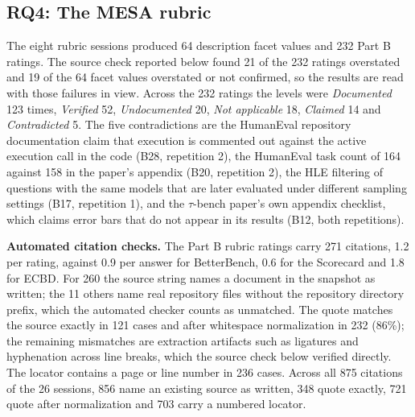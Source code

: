 \documentclass[10pt,conference]{IEEEtran}
\begin{document}
\subsection{RQ4: The MESA rubric}
\label{sec:rq4}
The eight rubric sessions produced 64 description facet values and 232 Part B ratings. The source check reported below found 21 of the 232 ratings overstated and 19 of the 64 facet values overstated or not confirmed, so the results are read with those failures in view. Across the 232 ratings the levels were \emph{Documented} 123 times, \emph{Verified} 52, \emph{Undocumented} 20, \emph{Not applicable} 18, \emph{Claimed} 14 and \emph{Contradicted} 5. The five contradictions are the HumanEval repository documentation claim that execution is commented out against the active execution call in the code (B28, repetition 2), the HumanEval task count of 164 against 158 in the paper's appendix (B20, repetition 2), the HLE filtering of questions with the same models that are later evaluated under different sampling settings (B17, repetition 1), and the $\tau$-bench paper's own appendix checklist, which claims error bars that do not appear in its results (B12, both repetitions).

\textbf{Automated citation checks.} The Part B rubric ratings carry 271 citations, 1.2 per rating, against 0.9 per answer for BetterBench, 0.6 for the Scorecard and 1.8 for ECBD. For 260 the source string names a document in the snapshot as written; the 11 others name real repository files without the repository directory prefix, which the automated checker counts as unmatched. The quote matches the source exactly in 121 cases and after whitespace normalization in 232 (86\%); the remaining mismatches are extraction artifacts such as ligatures and hyphenation across line breaks, which the source check below verified directly. The locator contains a page or line number in 236 cases. Across all 875 citations of the 26 sessions, 856 name an existing source as written, 348 quote exactly, 721 quote after normalization and 703 carry a numbered locator.
\end{document}
